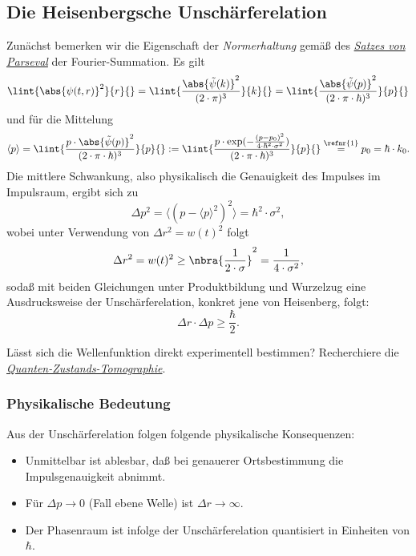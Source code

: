 \documentclass{subfiles}
\begin{document}
    \subsection{Die Heisenbergsche Unschärferelation}
        Zunächst bemerken wir die Eigenschaft der \emph{Normerhaltung} gemäß des \href{https://de.wikipedia.org/wiki/Satz_von_Parseval}{\emph{Satzes von Parseval}} der Fourier-Summation. Es gilt 
        \[\lint{\abs{\psi(t,r)}^2}{r}{} = \lint{\frac{\abs{\tilde\psi(k)}^2}{(2\cdot\pi)^3}}{k}{} = \lint{\frac{\abs{\tilde\psi(p)}^2}{(2\cdot\pi\cdot\hbar)^3}}{p}{}\]
        und für die Mittelung
        \[\langle p\rangle = \lint{\frac{p\cdot\abs{\tilde\psi(p)}^2}{(2\cdot\pi\cdot\hbar)^3}}{p}{} := \lint{\frac{p\cdot\exp(-\frac{(p-p_0)^2}{4\cdot\hbar^2\cdot\sigma^2})}{(2\cdot\pi\cdot\hbar)^3}}{p}{} \stackrel{\refnr{1}}{=} p_0 = \hbar\cdot k_0.\]
        Die mittlere Schwankung, also physikalisch die Genauigkeit des Impulses im Impulsraum, ergibt sich zu
        \[\Delta p^2 = \langle (p-\langle p\rangle^2)^2\rangle = \hbar^2\cdot\sigma^2,\]
        wobei unter Verwendung von $\Delta r^2 = w(t)^2$ folgt
        \[\Delta r^2 = w(t)^2\geq \nbra{\frac{1}{2\cdot\sigma}}^2 = \frac{1}{4\cdot\sigma^2},\]
        sodaß mit beiden Gleichungen unter Produktbildung und Wurzelzug eine Ausdrucksweise der Unschärferelation, konkret jene von Heisenberg, folgt:
        \[\Delta r \cdot\Delta p \geq \frac{\hbar}{2}.\]
        \begin{Aufgabe}
            \nr{} Lässt sich die Wellenfunktion direkt experimentell bestimmen? Recherchiere die \href{https://de.wikipedia.org/wiki/Quantentomographie}{\emph{Quanten-Zustands-Tomographie}}.
        \end{Aufgabe}

        \subsubsection*{Physikalische Bedeutung}
            Aus der Unschärferelation folgen folgende physikalische Konsequenzen:
            \begin{itemize}[label=$\to$]
                \item Unmittelbar ist ablesbar, daß bei genauerer Ortsbestimmung die Impulsgenauigkeit abnimmt. 
                \item Für $\Delta p\to 0$ (Fall ebene Welle) ist $\Delta r \to \infty$. 
                \item Der Phasenraum ist infolge der Unschärferelation quantisiert in Einheiten von $\hbar$.
            \end{itemize}
\end{document}
